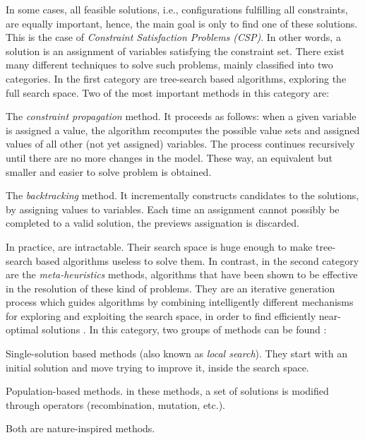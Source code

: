 In some cases, all feasible solutions, i.e., configurations fulfilling all constraints, are equally important, hence, the main goal is only to find  one of these solutions. This is the case of {\it Constraint Satisfaction Problems (CSP)}. In other words, a solution is an assignment of variables satisfying the constraint set. There exist many different techniques to solve such problems, mainly classified into two categories. In the first category are tree-search based algorithms, exploring the full search space. Two of the most important methods in this category are: \begin{inparaenum}[a)] \item The \textit{constraint propagation} method. It proceeds as follows: when a given variable is assigned a value, the algorithm recomputes the possible value sets and assigned values of all other (not yet assigned) variables. The process continues recursively until there are no more changes in the model. These way, an equivalent but smaller and easier to solve problem is obtained. \item The \textit{backtracking} method. It incrementally constructs candidates to the solutions, by assigning values to variables. Each time an assignment cannot possibly be completed to a valid solution, the previews assignation is discarded. \end{inparaenum} 

In practice, \CSPs{} are intractable. Their search space is huge enough to make tree-search based algorithms useless to solve them. In contrast, in the second category are the \textit{meta-heuristics} methods, algorithms that have been shown to be effective in the resolution of these kind of problems. They are an iterative generation process which guides algorithms by combining intelligently different mechanisms for exploring and exploiting the search space, in order to find efficiently near-optimal solutions \cite{Osman1996}. In this category, two groups of methods can be found \cite{Boussaid2013}: \begin{inparaenum}[a)] \item Single-solution based methods (also known as \textit{local search}). They start with an initial solution and move trying to improve it, inside the search space. \item Population-based methods. in these methods, a set of solutions is modified through operators (recombination, mutation, etc.). \end{inparaenum} Both are nature-inspired methods.

